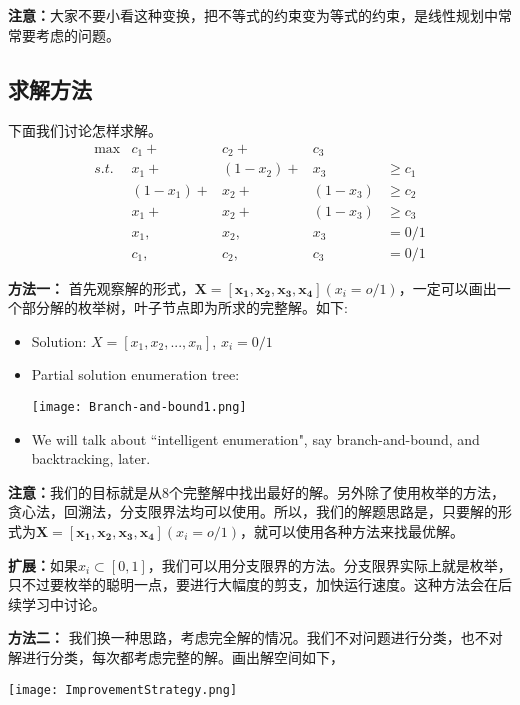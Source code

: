 \textbf{注意：}大家不要小看这种变换，把不等式的约束变为等式的约束，是线性规划中常常要考虑的问题。

\subsection{求解方法}
下面我们讨论怎样求解。
\[
\begin{array}{rrrrl}
 \max & c_1 +&  c_2 +& c_3 & \\
 s.t. & x_1 +& (1-x_2) +& x_3 & \geq c_1 \\
      & (1-x_1) +&  x_2 +& (1-x_3) & \geq c_2 \\
      & x_1 +&  x_2 +& (1-x_3) & \geq c_3 \\
      & x_1 ,& x_2 ,& x_3 & = 0/1 \\
      & c_1 ,& c_2 ,& c_3 & = 0/1
\end{array} \nonumber
\]

\textbf{方法一：}
首先观察解的形式，$\mathbf{X = [x_1, x_2, x_3, x_4]} (x_i = o/1)$，一定可以画出一个部分解的枚举树，叶子节点即为所求的完整解。如下:

\begin{itemize}
		\item Solution: $X=[x_1, x_2, ..., x_n]$, $x_i = 0/1$
		\item Partial solution enumeration tree:
	\begin{center}
		\texttt{[image: Branch-and-bound1.png]}
	\end{center}
		\item We will talk about ``intelligent enumeration", say branch-and-bound, and backtracking, later.
	\end{itemize}

\textbf{注意：}我们的目标就是从8个完整解中找出最好的解。另外除了使用枚举的方法，贪心法，回溯法，分支限界法均可以使用。所以，我们的解题思路是，只要解的形式为$\mathbf{X = [x_1, x_2, x_3, x_4]} (x_i = o/1)$，就可以使用各种方法来找最优解。

\textbf{扩展：}如果$x_i \subset [0,1]$，我们可以用分支限界的方法。分支限界实际上就是枚举，只不过要枚举的聪明一点，要进行大幅度的剪支，加快运行速度。这种方法会在后续学习中讨论。

\textbf{方法二：}
我们换一种思路，考虑完全解的情况。我们不对问题进行分类，也不对解进行分类，每次都考虑完整的解。画出解空间如下，

\begin{center}
		\texttt{[image: ImprovementStrategy.png]}
\end{center}

